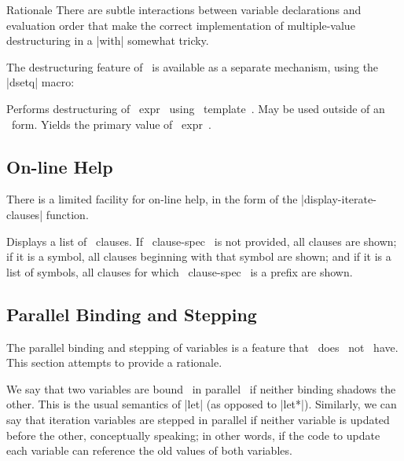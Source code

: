 \begin{note}{Rationale}
There are subtle interactions between variable declarations and
evaluation order that make the correct implementation of
multiple-value destructuring in a |with| somewhat tricky.
\end{note}

The destructuring feature of \iter\ is available as a separate
mechanism, using the |dsetq| macro:

\begin{clauses}
Performs destructuring of ~expr~ using ~template~.   May be used
outside of an \iter\ form. Yields the primary value of ~expr~.

\end{clauses}

\subsection{On-line Help}

\begin{sloppypar}
There is a limited facility for on-line help, in the form of the 
|display-iterate-clauses| function.
\end{sloppypar}

\begin{clauses}

Displays a list of \iter\ clauses.  If ~clause-spec~ is not
provided, all clauses are shown; if it is a symbol, all clauses
beginning with that symbol are shown; and if it is a list of symbols,
all clauses for which ~clause-spec~ is a prefix are shown.

\end{clauses}

\subsection{Parallel Binding and Stepping}
\label{bindings}

The parallel binding and stepping of variables is a feature that
\iter\ does ~not~ have.  This section attempts to provide a rationale.

We say that two variables are bound ~in parallel~ if neither
binding shadows the other.  This is the usual semantics of |let|
(as opposed to |let*|).  Similarly, we can say that iteration
variables are stepped in parallel if neither variable is updated
before the other, conceptually speaking; in other words, if the code
to update each variable can reference the old values of both variables.

